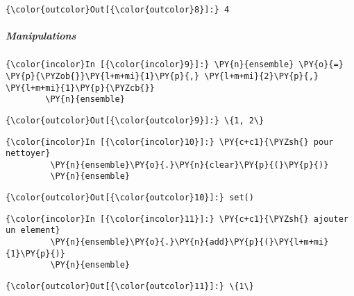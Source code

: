 \begin{Verbatim}[commandchars=\\\{\},frame=single,framerule=0.3mm,rulecolor=\color{cellframecolor}]
{\color{outcolor}Out[{\color{outcolor}8}]:} 4
\end{Verbatim}
            
    \hypertarget{manipulations}{%
\subparagraph{Manipulations}\label{manipulations}}

    \begin{Verbatim}[commandchars=\\\{\},frame=single,framerule=0.3mm,rulecolor=\color{cellframecolor}]
{\color{incolor}In [{\color{incolor}9}]:} \PY{n}{ensemble} \PY{o}{=} \PY{p}{\PYZob{}}\PY{l+m+mi}{1}\PY{p}{,} \PY{l+m+mi}{2}\PY{p}{,} \PY{l+m+mi}{1}\PY{p}{\PYZcb{}}
        \PY{n}{ensemble}
\end{Verbatim}


\begin{Verbatim}[commandchars=\\\{\},frame=single,framerule=0.3mm,rulecolor=\color{cellframecolor}]
{\color{outcolor}Out[{\color{outcolor}9}]:} \{1, 2\}
\end{Verbatim}
            
    \begin{Verbatim}[commandchars=\\\{\},frame=single,framerule=0.3mm,rulecolor=\color{cellframecolor}]
{\color{incolor}In [{\color{incolor}10}]:} \PY{c+c1}{\PYZsh{} pour nettoyer}
         \PY{n}{ensemble}\PY{o}{.}\PY{n}{clear}\PY{p}{(}\PY{p}{)}
         \PY{n}{ensemble}
\end{Verbatim}


\begin{Verbatim}[commandchars=\\\{\},frame=single,framerule=0.3mm,rulecolor=\color{cellframecolor}]
{\color{outcolor}Out[{\color{outcolor}10}]:} set()
\end{Verbatim}
            
    \begin{Verbatim}[commandchars=\\\{\},frame=single,framerule=0.3mm,rulecolor=\color{cellframecolor}]
{\color{incolor}In [{\color{incolor}11}]:} \PY{c+c1}{\PYZsh{} ajouter un element}
         \PY{n}{ensemble}\PY{o}{.}\PY{n}{add}\PY{p}{(}\PY{l+m+mi}{1}\PY{p}{)}
         \PY{n}{ensemble}
\end{Verbatim}


\begin{Verbatim}[commandchars=\\\{\},frame=single,framerule=0.3mm,rulecolor=\color{cellframecolor}]
{\color{outcolor}Out[{\color{outcolor}11}]:} \{1\}
\end{Verbatim}
            
